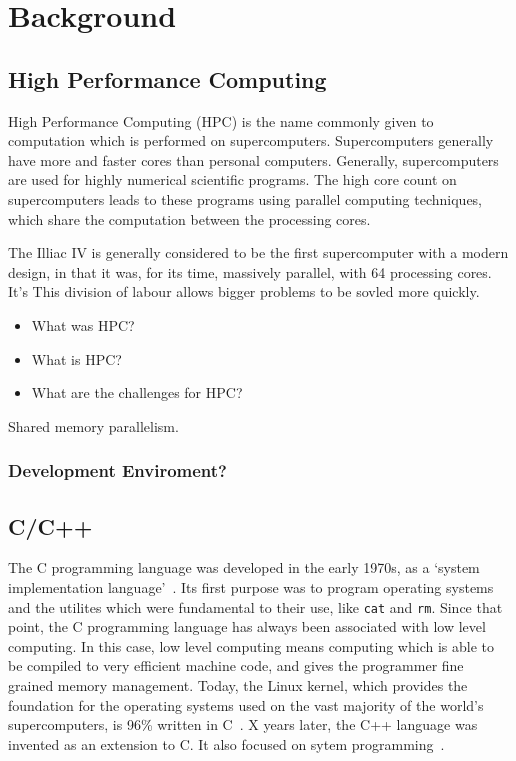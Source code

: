 \chapter{Background}
\section{High Performance Computing}
High Performance Computing (HPC) is the name commonly given to computation which is performed on supercomputers. 
Supercomputers generally have more and faster cores than personal computers. Generally, supercomputers are used for highly numerical scientific programs. The high core count on supercomputers leads to these programs using parallel computing techniques, which share the computation between the processing cores.

The Illiac IV is generally considered to be the first supercomputer with a modern design, in that it was, for its time, massively parallel, with 64 processing cores. It's 
This division of labour allows bigger problems to be sovled more quickly.

\begin{itemize}
    \item What was HPC?
    \item What is HPC?
    \item What are the challenges for HPC?
\end{itemize}

Shared memory parallelism.
\subsection{Development Enviroment?}

\section{C/C++}
The C programming language was developed in the early 1970s, as a `system implementation language'~\cite{Ritchie:1993}. Its first purpose was to program operating systems and the utilites which were fundamental to their use, like \texttt{cat} and \texttt{rm}. Since that point, the C programming language has always been associated with low level computing. In this case, low level computing means computing which is able to be compiled to very efficient machine code, and gives the programmer fine grained memory management.
Today, the Linux kernel, which provides the foundation for the operating systems used on the vast majority of the world's supercomputers, is 96\% written in C~\cite{LinuxKernel}. X years later, the C++ language was invented as an extension to C. It also focused on sytem programming~\cite{CplusEssence}.

